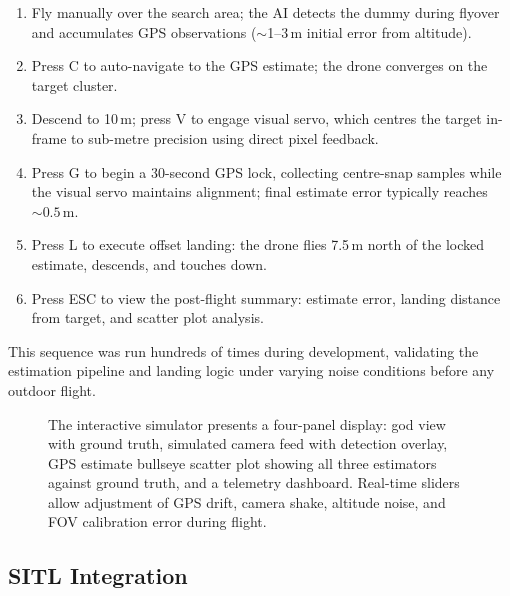 \begin{enumerate}
    \item Fly manually over the search area; the AI detects the dummy during flyover and accumulates GPS observations ($\sim$1--3\,m initial error from altitude).
    \item Press C to auto-navigate to the GPS estimate; the drone converges on the target cluster.
    \item Descend to 10\,m; press V to engage visual servo, which centres the target in-frame to sub-metre precision using direct pixel feedback.
    \item Press G to begin a 30-second GPS lock, collecting centre-snap samples while the visual servo maintains alignment; final estimate error typically reaches ${\sim}0.5$\,m.
    \item Press L to execute offset landing: the drone flies 7.5\,m north of the locked estimate, descends, and touches down.
    \item Press ESC to view the post-flight summary: estimate error, landing distance from target, and scatter plot analysis.
\end{enumerate}

This sequence was run hundreds of times during development, validating the estimation pipeline and landing logic under varying noise conditions before any outdoor flight.

\begin{figure}[H]
\centering
{}
\caption{The interactive simulator presents a four-panel display: god view with ground truth, simulated camera feed with detection overlay, GPS estimate bullseye scatter plot showing all three estimators against ground truth, and a telemetry dashboard. Real-time sliders allow adjustment of GPS drift, camera shake, altitude noise, and FOV calibration error during flight.}
\label{fig:simulator}
\end{figure}

\subsection{SITL Integration}\label{sec:sim-sitl}

